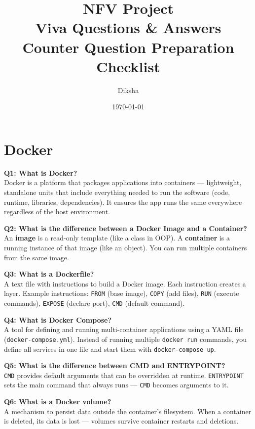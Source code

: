 \documentclass[12pt,a4paper]{article}
\title{
    \vspace{-2cm}
    \textbf{\Huge NFV Project}\\[0.5cm]
    \Large Viva Questions \& Answers\\[0.3cm]
    \large Counter Question Preparation Checklist
}
\author{Diksha}
\date{\today}
\begin{document}
\maketitle
\thispagestyle{empty}
\newpage
\tableofcontents
\newpage

\section{Docker}

\textbf{Q1: What is Docker?}\\
Docker is a platform that packages applications into containers --- lightweight, standalone units that include everything needed to run the software (code, runtime, libraries, dependencies). It ensures the app runs the same everywhere regardless of the host environment.

\textbf{Q2: What is the difference between a Docker Image and a Container?}\\
An \textbf{image} is a read-only template (like a class in OOP). A \textbf{container} is a running instance of that image (like an object). You can run multiple containers from the same image.

\textbf{Q3: What is a Dockerfile?}\\
A text file with instructions to build a Docker image. Each instruction creates a layer. Example instructions: \texttt{FROM} (base image), \texttt{COPY} (add files), \texttt{RUN} (execute commands), \texttt{EXPOSE} (declare port), \texttt{CMD} (default command).

\textbf{Q4: What is Docker Compose?}\\
A tool for defining and running multi-container applications using a YAML file (\texttt{docker-compose.yml}). Instead of running multiple \texttt{docker run} commands, you define all services in one file and start them with \texttt{docker-compose up}.

\textbf{Q5: What is the difference between CMD and ENTRYPOINT?}\\
\texttt{CMD} provides default arguments that can be overridden at runtime. \texttt{ENTRYPOINT} sets the main command that always runs --- \texttt{CMD} becomes arguments to it.

\textbf{Q6: What is a Docker volume?}\\
A mechanism to persist data outside the container's filesystem. When a container is deleted, its data is lost --- volumes survive container restarts and deletions.
\end{document}
